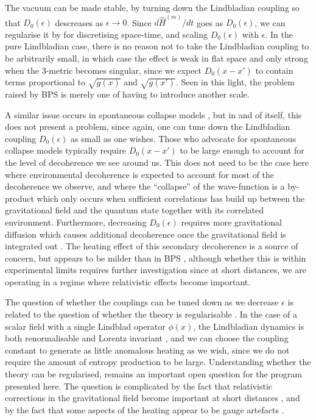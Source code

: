 \documentclass[aps,pra,showpacs,citeautoscript,amsmath,amssymb,floatfix,superscriptaddress,bbm, verbatim,amsfonts,changes,11pt,nofootinbib,longbibliography]{revtex4-2}
\def\qmatterham{\hat{H}^{(m)}}
\begin{document}
The vacuum can be made stable, by turning down the Lindbladian coupling so that $D_0(\epsilon)$ descreases as $\epsilon\rightarrow 0$. Since $d{\qmatterham}/dt$ goes as $D_0(\epsilon)$, we can regularise it by for discretising space-time, and scaling $D_0(\epsilon)$ with $\epsilon$. 
In the pure Lindbladian case, there is no reason not to take the Lindbladian coupling to be arbitrarily small, in which case the effect is weak in flat space and only strong when the 3-metric becomes singular, since we expect $D_0(x-x')$ to contain terms proportional to $\sqrt{g(x)}$ and $\sqrt{g(x')}$. Seen in this light, the problem raised by BPS is merely one of having to introduce another scale.

A similar issue occurs in spontaneous collapse models \cite{ballentine1991failure,gallis1991comparison,shimony1990desiderata}, but in and of itself, this does not present a problem, since again, one can tune down the Lindbladian coupling $D_0(\epsilon)$ as small as one wishes. Those who advocate for spontaneous collapse models typically require $D_0(x-x')$ to be large enough to account for the level of decoherence we see around us. This does not need to be the case here where environmental decoherence is expected to account for most of the decoherence we observe, and where the ``collapse'' of the wave-function is a by-product which only occurs when sufficient correlations has build up between the gravitational field and the quantum state together with its correlated environment. Furthermore, decreasing $D_0(\epsilon)$ requires more gravitational diffusion \cite{oppenheim2021gravitationally} which causes additional decoherence once the gravitational field is integrated out \cite{tilloy2016sourcing,UCLcoherence}. The heating effect of this secondary decoherence is a source of concern, but appears to be milder than in BPS \cite{UCLcoherence,oppenheim2021gravitationally}, although whether this is within experimental limits requires further investigation since at short distances, we are operating in a regime where relativistic effects become important.


The question of whether the couplings can be tuned down as we decrease $\epsilon$ is related to the question of whether the theory is regularisable \cite{oppenheim2023path}. 
In the case of a scalar field with a single Lindblad operator $\phi(x)$, the Lindbladian dynamics is both renormalisable and Lorentz invariant \cite{baidya2017renormalization,UCLLorentz}, and we can choose the coupling constant to generate as little anomalous heating as we wish, since we do not require the amount of entropy production to be large.
 Understanding whether the theory can be regularised, remains an important open question for the program presented here. The question is complicated by the fact that relativistic corrections in the gravitational field become important at short distances \cite{UCLDMDNE}, and by the fact that some aspects of the heating appear to be gauge artefacts \cite{layton2023weak}. %
\end{document}
